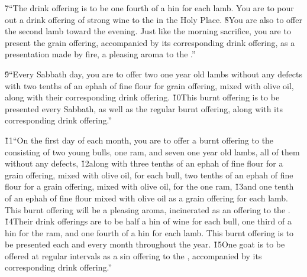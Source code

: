 \v{7}``The drink offering is to be one fourth of a hin for each lamb. You are to pour out a drink offering of strong wine to the  in the Holy Place. \v{8}You are also to offer the second lamb toward the evening. Just like the morning sacrifice, you are to present the grain offering, accompanied by its corresponding drink offering, as a presentation made by fire, a pleasing aroma to the .''

\v{9}``Every Sabbath day, you are to offer two one year old lambs without any defects with two tenths of an ephah of fine flour for grain offering, mixed with olive oil, along with their corresponding drink offering. \v{10}This burnt offering is to be presented every Sabbath, as well as the regular burnt offering, along with its corresponding drink offering.''

\v{11}``On the first day of each month, you are to offer a burnt offering to the  consisting of two young bulls, one ram, and seven one year old lambs, all of them without any defects, \v{12}along with three tenths of an ephah of fine flour for a grain offering, mixed with olive oil, for each bull, two tenths of an ephah of fine flour for a grain offering, mixed with olive oil, for the one ram, \v{13}and one tenth of an ephah of fine flour mixed with olive oil as a grain offering for each lamb. This burnt offering will be a pleasing aroma, incinerated as an offering to the . \v{14}Their drink offerings are to be half a hin of wine for each bull, one third of a hin for the ram, and one fourth of a hin for each lamb. This burnt offering is to be presented each and every month throughout the year. \v{15}One goat is to be offered at regular intervals as a sin offering to the , accompanied by its corresponding drink offering.''

